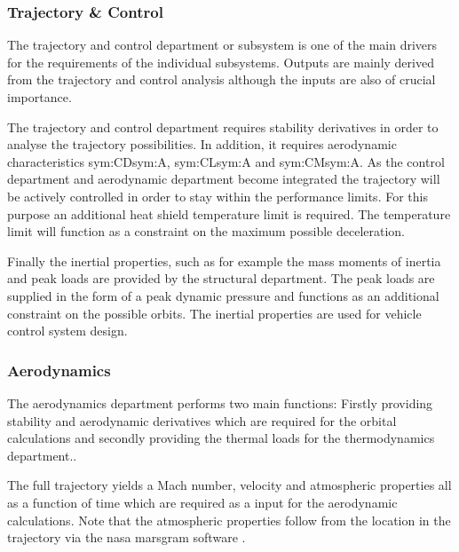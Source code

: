 \subsubsection{Trajectory \& Control}
The trajectory and control department or subsystem is one of the main drivers for the requirements of the individual subsystems. Outputs are mainly derived from the trajectory and control analysis although the inputs are also of crucial importance. 

The trajectory and control department requires stability derivatives in order to analyse the trajectory possibilities. In addition, it requires aerodynamic characteristics \gls{sym:CD}\gls{sym:A}, \gls{sym:CL}\gls{sym:A} and \gls{sym:CM}\gls{sym:A}.
As the control department and aerodynamic department become integrated the trajectory will be actively controlled in order to stay within the performance limits. For this purpose an additional heat shield temperature limit is required. The temperature limit will function as a constraint on the maximum possible deceleration.

Finally the inertial properties, such as for example the mass moments of inertia and peak loads are provided by the structural department. The peak loads are supplied in the form of a peak dynamic pressure and functions as an additional constraint on the possible orbits. The inertial properties are used for vehicle control system design.

\subsubsection{Aerodynamics}
The aerodynamics department performs two main functions: Firstly providing stability and aerodynamic derivatives which are required for the orbital calculations and secondly providing the thermal loads for the thermodynamics department.. %

The full trajectory yields a Mach number, velocity and atmospheric properties all as a function of time which are required as a input for the aerodynamic calculations. Note that the atmospheric properties follow from the location in the trajectory via the \gls{nasa} \gls{marsgram} software \cite{Justus2001}.

